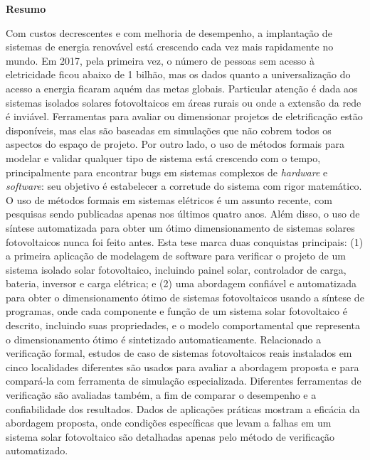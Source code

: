 \thispagestyle{plain}
\begin{center}
%    
%    
%    
    \vspace{0.9cm}
    \textbf{Resumo}
\end{center}
Com custos decrescentes e com melhoria de desempenho, a implantação de sistemas de energia renovável está crescendo cada vez mais rapidamente no mundo. Em 2017, pela primeira vez, o número de pessoas sem acesso à eletricidade ficou abaixo de 1 bilhão, mas os dados quanto a universalização do acesso a energia ficaram aquém das metas globais. Particular atenção é dada aos sistemas isolados solares fotovoltaicos em áreas rurais ou onde a extensão da rede é inviável. 
Ferramentas para avaliar ou dimensionar projetos de eletrificação estão disponíveis, mas elas são baseadas em simulações que não cobrem todos os aspectos do espaço de projeto. Por outro lado, o uso de métodos formais para modelar e validar qualquer tipo de sistema está crescendo com o tempo, principalmente para encontrar bugs em sistemas complexos de \textit{hardware} e \textit{software}: seu objetivo é estabelecer a corretude do sistema com rigor matemático. 
O uso de métodos formais em sistemas elétricos é um assunto recente, com pesquisas sendo publicadas apenas nos últimos quatro anos. Além disso, o uso de síntese automatizada para obter um ótimo dimensionamento de sistemas solares fotovoltaicos nunca foi feito antes. 
Esta tese marca duas conquistas principais: (1) a primeira aplicação de modelagem de software para verificar o projeto de um sistema isolado solar fotovoltaico, incluindo painel solar, controlador de carga, bateria, inversor e carga elétrica; e (2) uma abordagem confiável e automatizada para obter o dimensionamento ótimo de sistemas fotovoltaicos usando a síntese de programas, onde cada componente e função de um sistema solar fotovoltaico é descrito, incluindo suas propriedades, e o modelo comportamental que representa o dimensionamento ótimo é sintetizado automaticamente. 
Relacionado a verificação formal, estudos de caso de sistemas fotovoltaicos reais instalados em cinco localidades diferentes são usados para avaliar a abordagem proposta e para compará-la com ferramenta de simulação especializada.
Diferentes ferramentas de verificação são avaliadas também, a fim de comparar o desempenho e a confiabilidade dos resultados. Dados de aplicações práticas mostram a eficácia da abordagem proposta, onde condições específicas que levam a falhas em um sistema solar fotovoltaico são detalhadas apenas pelo método de verificação automatizado. 
